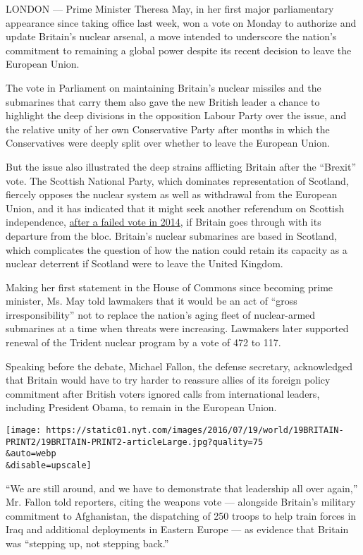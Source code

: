 LONDON --- Prime Minister Theresa May, in her first major parliamentary
appearance since taking office last week, won a vote on Monday to
authorize and update Britain's nuclear arsenal, a move intended to
underscore the nation's commitment to remaining a global power despite
its recent decision to leave the European Union.

The vote in Parliament on maintaining Britain's nuclear missiles and the
submarines that carry them also gave the new British leader a chance to
highlight the deep divisions in the opposition Labour Party over the
issue, and the relative unity of her own Conservative Party after months
in which the Conservatives were deeply split over whether to leave the
European Union.

But the issue also illustrated the deep strains afflicting Britain after
the ``Brexit'' vote. The Scottish National Party, which dominates
representation of Scotland, fiercely opposes the nuclear system as well
as withdrawal from the European Union, and it has indicated that it
might seek another referendum on Scottish independence,
\href{http://www.nytimes.com/2014/09/19/world/europe/scotland-independence-vote.html}{after
a failed vote in 2014}, if Britain goes through with its departure from
the bloc. Britain's nuclear submarines are based in Scotland, which
complicates the question of how the nation could retain its capacity as
a nuclear deterrent if Scotland were to leave the United Kingdom.

Making her first statement in the House of Commons since becoming prime
minister, Ms. May told lawmakers that it would be an act of ``gross
irresponsibility'' not to replace the nation's aging fleet of
nuclear-armed submarines at a time when threats were increasing.
Lawmakers later supported renewal of the Trident nuclear program by a
vote of 472 to 117.

Speaking before the debate, Michael Fallon, the defense secretary,
acknowledged that Britain would have to try harder to reassure allies of
its foreign policy commitment after British voters ignored calls from
international leaders, including President Obama, to remain in the
European Union.

\texttt{[image: https://static01.nyt.com/images/2016/07/19/world/19BRITAIN-PRINT2/19BRITAIN-PRINT2-articleLarge.jpg?quality=75\\\&auto=webp\\\&disable=upscale]}

``We are still around, and we have to demonstrate that leadership all
over again,'' Mr. Fallon told reporters, citing the weapons vote ---
alongside Britain's military commitment to Afghanistan, the dispatching
of 250 troops to help train forces in Iraq and additional deployments in
Eastern Europe --- as evidence that Britain was ``stepping up, not
stepping back.''

